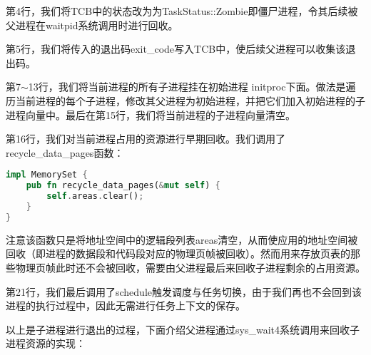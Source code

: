 第4行，我们将TCB中的状态改为为TaskStatus::Zombie即僵尸进程，令其后续被父进程在waitpid系统调用时进行回收。

第5行，我们将传入的退出码exit\_code写入TCB中，使后续父进程可以收集该退出码。

第7$\sim$13行，我们将当前进程的所有子进程挂在初始进程 initproc下面。做法是遍历当前进程的每个子进程，修改其父进程为初始进程，并把它们加入初始进程的子进程向量中。最后在第15行，我们将当前进程的子进程向量清空。

第16行，我们对当前进程占用的资源进行早期回收。我们调用了recycle\_data\_pages函数：

\begin{lstlisting}[language={Rust}, label={code:exit},
	caption={os/src/mm/memory\_set.rs}]
impl MemorySet {
	pub fn recycle_data_pages(&mut self) {
		self.areas.clear();
	}
}
\end{lstlisting}

注意该函数只是将地址空间中的逻辑段列表areas清空，从而使应用的地址空间被回收（即进程的数据段和代码段对应的物理页帧被回收）。然而用来存放页表的那些物理页帧此时还不会被回收，需要由父进程最后来回收子进程剩余的占用资源。

第21行，我们最后调用了schedule触发调度与任务切换，由于我们再也不会回到该进程的执行过程中，因此无需进行任务上下文的保存。

以上是子进程进行退出的过程，下面介绍父进程通过sys\_wait4系统调用来回收子进程资源的实现：


